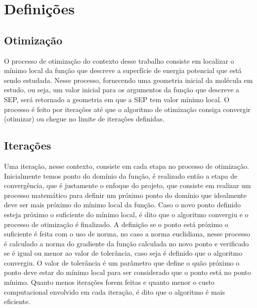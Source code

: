 \section{Definições}

\subsection{Otimização}

O processo de otimização do contexto desse trabalho consiste em localizar o mínimo local da função que descreve a superfície de energia potencial que está sendo estudada. Nesse processo, fornecendo uma geometria inicial da molécula em estudo, ou seja, um valor inicial para os argumentos da função que descreve a SEP, será retornado a geometria em que a SEP tem valor mínimo local. O processo é feito por iterações até que o algoritmo de otimização consiga convergir (otimizar) ou chegue no limite de iterações definidas.

\subsection{Iterações}

Uma iteração, nesse contexto, consiste em cada etapa no processo de otimização. Inicialmente temos ponto do domínio da função, é realizado então a etapa de convergência, que é justamente o enfoque do projeto, que consiste em realizar um processo matemático para definir um próximo ponto do domínio que idealmente deve ser mais próximo do mínimo local da função. Caso o novo ponto definido esteja próximo o suficiente do mínimo local, é dito que o algoritmo convergiu e o processo de otimização é finalizado. A definição se o ponto está próximo o suficiente é feita com o uso de norma, no caso a norma euclidiana, nesse processo é calculado a norma do gradiente da função calculada no novo ponto e verificado se é igual ou menor ao valor de tolerância, caso seja é definido que o algoritmo convergiu. O valor de tolerância é um parâmetro que define o quão próximo o ponto deve estar do mínimo local para ser considerado que o ponto está no ponto mínimo. Quanto menos iterações forem feitas e quanto menor o custo computacional envolvido em cada iteração, é dito que o algoritmo é mais eficiente.
